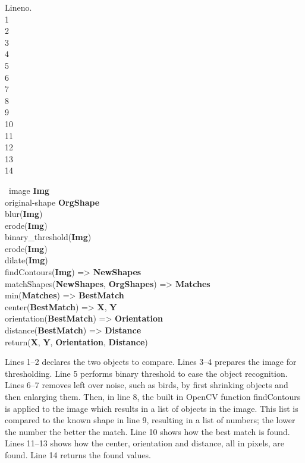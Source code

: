 \begin{center}
	\begin{minipage}[t]{0.1\textwidth}
		\begin{flushright}
			Lineno.\\1\\2\\3\\4\\5\\6\\7\\8\\9\\10\\11\\12\\13\\14
		\end{flushright}
	\end{minipage}
	\begin{minipage}[t]{0.8\textwidth}
		~\-image \textbf{Img}\\
		original-shape \textbf{OrgShape}\\
		blur(\textbf{Img})\\
		erode(\textbf{Img})\\
		binary\_threshold(\textbf{Img})\\
		erode(\textbf{Img})\\
		dilate(\textbf{Img})\\
		findContours(\textbf{Img}) => \textbf{NewShapes}\\
		matchShapes(\textbf{NewShapes}, \textbf{OrgShapes}) => \textbf{Matches}\\
		min(\textbf{Matches}) => \textbf{BestMatch}\\
		center(\textbf{BestMatch}) => \textbf{X}, \textbf{Y}\\
		orientation(\textbf{BestMatch}) => \textbf{Orientation}\\
		distance(\textbf{BestMatch}) => \textbf{Distance}\\
		return(\textbf{X}, \textbf{Y}, \textbf{Orientation}, \textbf{Distance})
	\end{minipage}
\end{center}
Lines 1--2 declares the two objects to compare. Lines 3--4 prepares the image for thresholding. Line 5 performs binary threshold to ease the object recognition. Lines 6--7 removes left over noise, such as birds, by first shrinking objects and then enlarging them. Then, in line 8, the built in OpenCV function findContours is applied to the image which results in a list of objects in the image. This list is compared to the known shape in line 9, resulting in a list of numbers; the lower the number the better the match. Line 10 shows how the best match is found. Lines 11--13 shows how the center, orientation and distance, all in pixels, are found. Line 14 returns the found values.

